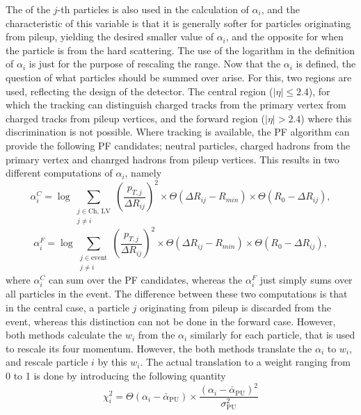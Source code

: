 The \pt of the $j$-th particles is also used in the calculation of $\alpha_{i}$, and the characteristic of this variable is that it is generally softer for particles originating from pileup, yielding the desired smaller value of $\alpha_{i}$, and the opposite for when the particle is from the hard scattering. 
The use of the logarithm in the definition of $\alpha_{i}$ is just for the purpose of rescaling the range. 
Now that the $\alpha_{i}$ is defined, the question of what particles should be summed over arise. For this, two regions are used, reflecting the design of the detector. 
The central region ($|\eta|\leq2.4$), for which the tracking can distinguish charged tracks from the primary vertex from charged tracks from pileup vertices, and the forward region ($|\eta|>2.4$) where this discrimination is not possible.
Where tracking is available, the PF algorithm can provide the following PF candidates; neutral particles, charged hadrons from the primary vertex and chanrged hadrons from pileup vertices.   
This results in two different computations of $\alpha_{i}$, namely
\begin{equation}
  \alpha_i^{C} = \log \sum_{\substack{j \in \text{Ch, LV} \\ j \neq i}} \left(\frac{p_{T, j}}{\Delta R_{ij}}\right)^{2} \times \Theta(\Delta R_{ij}-R_{min})\times \Theta(R_{0}-\Delta R_{ij}),
\end{equation}
\begin{equation}
  \alpha_i^{F} = \log \sum_{\substack{j \in \text{event} \\ j \neq i}} \left(\frac{p_{T, j}}{\Delta R_{ij}}\right)^{2} \times \Theta(\Delta R_{ij}-R_{min})\times \Theta(R_{0}-\Delta R_{ij}),
\end{equation}
where $\alpha_{i}^{C}$ can sum over the PF candidates, whereas the $\alpha_{i}^{F}$ just simply sums over all particles in the event. 
The difference between these two computations is that in the central case, a particle $j$ originating from pileup is discarded from the event, whereas this distinction can not be done in the forward case. 
However, both methods calculate the $w_{i}$ from the $\alpha_{i}$ similarly for each particle, that is used to rescale its four momentum.  
However, the both methods translate the $\alpha_{i}$ to $w_{i}$, and rescale particle $i$ by this $w_{i}$. The actual translation to a weight ranging from 0 to 1 is done by introducing the following quantity
\begin{equation}
\chi_i^2=\Theta(\alpha_{i}-\bar{\alpha}_{\text{PU}})\times \frac{(\alpha_{i}-\bar{\alpha}_{\mathrm{PU}})^{2}}{\sigma_{\mathrm{PU}}^{2}}
\end{equation}



\clearpage

